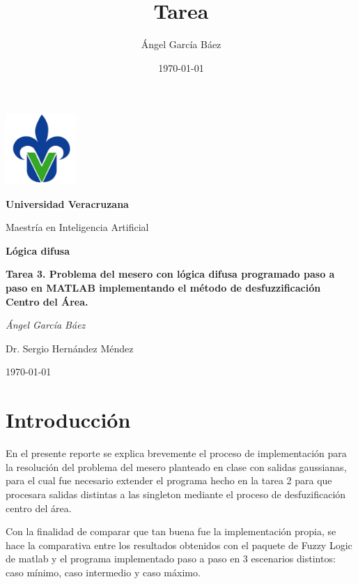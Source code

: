 \documentclass[11pt, letterpaper]{article}
\title{\bfseries Tarea}
\author{Ángel García Báez}
\date{\today}
\begin{document}
	\begin{titlepage}
		\centering
		\includegraphics[width=0.2\textwidth]{logo.png}\par
		\vspace{1cm}
		{\LARGE \bfseries Universidad Veracruzana \par}
		\vspace{1cm}
		{\Large Maestría en Inteligencia Artificial\par}
		\vspace{3cm}
		{\LARGE \bfseries Lógica difusa \par}
		\vspace{1cm}
		{\Large \bfseries Tarea 3. Problema del mesero con lógica difusa programado paso a paso en MATLAB implementando el método de desfuzzificación Centro del Área. \par}
		\vfill
		{\Large \textit{Ángel García Báez}\par}
		\vfill
		{\Large Dr. Sergio Hernández Méndez \par}
		\vfill
		{\Large \today \par}
	\end{titlepage}
	
	\newpage
	\tableofcontents
	\newpage
	

\section{Introducción}

En el presente reporte se explica brevemente el proceso de implementación para la resolución del problema del mesero planteado en clase con salidas gaussianas, para el cual fue necesario extender el programa hecho en la tarea 2 para que procesara salidas distintas a las singleton mediante el proceso de desfuzificación centro del área.

Con la finalidad de comparar que tan buena fue la implementación propia, se hace la comparativa entre los resultados obtenidos con el paquete de Fuzzy Logic de matlab y el programa implementado paso a paso en 3 escenarios distintos: caso mínimo, caso intermedio y caso máximo.
\end{document}
